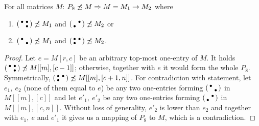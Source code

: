 \begin{lemma}
\label{lemma:p72}
For all matrices $M$: $P_8\not\preceq M\Rightarrow M=M_1\rightarrow M_2$ where
\begin{enumerate}
\item $\left(\begin{smallmatrix}\bullet&\bullet\\ &\bullet\end{smallmatrix}\right)\not\preceq M_1$ and $\left(\begin{smallmatrix} &\bullet\\\bullet& \end{smallmatrix}\right)\not\preceq M_2$ or
\item $\left(\begin{smallmatrix}\bullet& \\ &\bullet\end{smallmatrix}\right)\not\preceq M_1$ and $\left(\begin{smallmatrix}\bullet&\bullet\\\bullet& \end{smallmatrix}\right)\not\preceq M_2$.
\end{enumerate}
\end{lemma}
\begin{proof}
Let $e=M[r,c]$ be an arbitrary top-most one-entry of $M$. It holds $\left(\begin{smallmatrix}\bullet&\bullet\\ &\bullet\end{smallmatrix}\right)\not\preceq M[[m],[c-1]]$; otherwise, together with $e$ it would form the whole $P_8$. Symmetrically, $\left(\begin{smallmatrix}\bullet&\bullet\\\bullet& \end{smallmatrix}\right)\not\preceq M[[m],[c+1,n]]$. For contradiction with statement, let $e_1,\ e_2$ (none of them equal to $e$) be any two one-entries forming $\left(\begin{smallmatrix}\bullet& \\ &\bullet\end{smallmatrix}\right)$ in $M[[m],[c]]$ and let $e'_1,\ e'_2$ be any two one-entries forming $\left(\begin{smallmatrix} &\bullet\\\bullet& \end{smallmatrix}\right)$ in $M[[m],[c,n]]$. Without loss of generality, $e'_2$ is lower than $e_2$ and together with $e_1,\ e$ and $e'_1$ it gives us a mapping of $P_8$ to $M$, which is a contradiction.
\end{proof}

